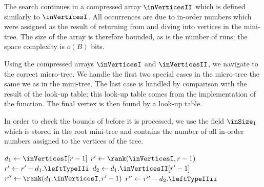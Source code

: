 The search continues in a compressed array $\inVerticesII$ which is defined similarly to $\inVerticesI$.
All occurrences are due to in-order numbers which were assigned as the result of returning from and diving into vertices in the mini-tree.
The size of the array is therefore bounded, as is the number of runs; the space complexity is $o(B)$ bits.

Using the compressed arrays $\inVerticesI$ and $\inVerticesII$, we navigate to the correct micro-tree.
We handle the first two special cases in the micro-tree the same we as in the mini-tree.
The last case is handled by comparison with the result of the \inSize{} look-up table; this look-up table comes from the implementation of the \inSize{} function.
The final vertex is then found by a look-up table.

In order to check the bounds of \inSelect{} before it is processed, we use the field $\inSize_1$ which is stored in the root mini-tree and contains the number of all in-order numbers assigned to the vertices of the tree.

\begin{algorithm}
\begin{algorithmic}
	\State $d_1 \gets \inVerticesI[r - 1]$
	\State $r' \gets \rank(\inVerticesI, r - 1)$
	 
		\State {}
	 
		\State {}
	\Else
		\State $r' \gets r' - d_1.\leftTypeIIi$
		 
			\State {}
		\Else {}
			\State $d_2 \gets d_1.\inVerticesII[r' - 1]$
			\State $r'' \gets \rank(d_1.\inVerticesI, r' - 1)$
			 
				\State {}
			 
				\State {}
			\Else
				\State $r'' \gets r'' - d_2.\leftTypeIIii$
				 
					\State {}
				\Else
					\State {}
				\EndIf
			\EndIf
		\EndIf
	\EndIf
\EndFunction
\end{algorithmic}
\end{algorithm}

